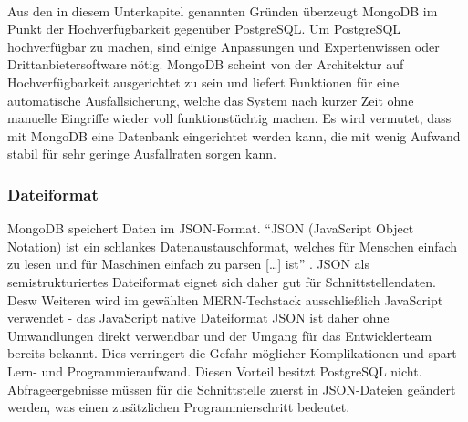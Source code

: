 \paragraph{}
Aus den in diesem Unterkapitel genannten Gründen überzeugt MongoDB im Punkt der Hochverfügbarkeit gegenüber PostgreSQL.
Um PostgreSQL hochverfügbar zu machen, sind einige Anpassungen und Expertenwissen oder Drittanbietersoftware nötig.
MongoDB scheint von der Architektur auf Hochverfügbarkeit ausgerichtet zu sein und liefert Funktionen für eine automatische Ausfallsicherung, welche das System nach kurzer Zeit ohne manuelle Eingriffe wieder voll funktionstüchtig machen.
Es wird vermutet, dass mit MongoDB eine Datenbank eingerichtet werden kann, die mit wenig Aufwand stabil für sehr geringe Ausfallraten sorgen kann.

\subsubsection{Dateiformat}
MongoDB speichert Daten im JSON-Format. 
\enquote{JSON (JavaScript Object Notation) ist ein schlankes Datenaustauschformat, welches für Menschen einfach zu lesen und für Maschinen einfach zu parsen [\dots] ist} \cite{db:json}. 
JSON als semistrukturiertes Dateiformat eignet sich daher gut für Schnittstellendaten.\\
Desw Weiteren wird im gewählten MERN-Techstack ausschließlich JavaScript verwendet - das JavaScript native Dateiformat JSON ist daher ohne Umwandlungen direkt verwendbar und der Umgang für das Entwicklerteam bereits bekannt.
Dies verringert die Gefahr möglicher Komplikationen und spart Lern- und Programmieraufwand.
Diesen Vorteil besitzt PostgreSQL nicht.
Abfrageergebnisse müssen für die Schnittstelle zuerst in JSON-Dateien geändert werden, was einen zusätzlichen Programmierschritt bedeutet.

